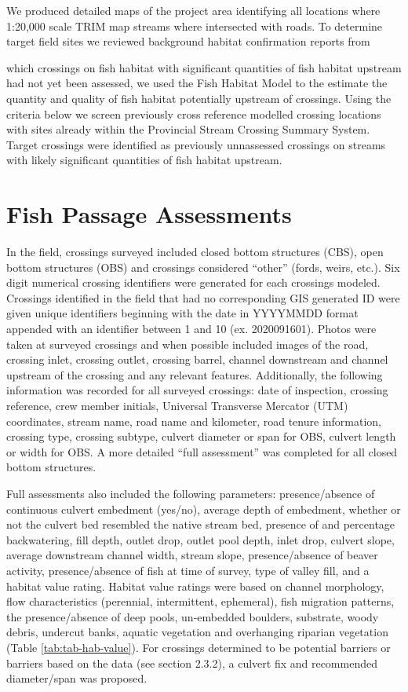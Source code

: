 \documentclass[
]{book}
\begin{document}
We produced detailed maps of the project area identifying all locations where 1:20,000 scale TRIM map streams where intersected with roads. To determine target field sites we reviewed background habitat confirmation reports from \citep{masseEKConfirmation2015}

which crossings on fish habitat with significant quantities of fish habitat upstream had not yet been assessed, we used the Fish Habitat Model to the estimate the quantity and quality of fish habitat potentially upstream of crossings. Using the criteria below we screen previously cross reference modelled crossing locations with sites already within the Provincial Stream Crossing Summary System. Target crossings were identified as previously unnassessed crossings on streams with likely significant quantities of fish habitat upstream.

\hypertarget{fish-passage-assessments}{%
\section{Fish Passage Assessments}\label{fish-passage-assessments}}

In the field, crossings surveyed included closed bottom structures (CBS), open bottom structures (OBS) and crossings considered ``other'' (fords, weirs, etc.). Six digit numerical crossing identifiers were generated for each crossings modeled. Crossings identified in the field that had no corresponding GIS generated ID were given unique identifiers beginning with the date in YYYYMMDD format appended with an identifier between 1 and 10 (ex. 2020091601). Photos were taken at surveyed crossings and when possible included images of the road, crossing inlet, crossing outlet, crossing barrel, channel downstream and channel upstream of the crossing and any relevant features. Additionally, the following information was recorded for all surveyed crossings: date of inspection, crossing reference, crew member initials, Universal Transverse Mercator (UTM) coordinates, stream name, road name and kilometer, road tenure information, crossing type, crossing subtype, culvert diameter or span for OBS, culvert length or width for OBS. A more detailed ``full assessment'' was completed for all closed bottom structures.

Full assessments also included the following parameters: presence/absence of continuous culvert embedment (yes/no), average depth of embedment, whether or not the culvert bed resembled the native stream bed, presence of and percentage backwatering, fill depth, outlet drop, outlet pool depth, inlet drop, culvert slope, average downstream channel width, stream slope, presence/absence of beaver activity, presence/absence of fish at time of survey, type of valley fill, and a habitat value rating. Habitat value ratings were based on channel morphology, flow characteristics (perennial, intermittent, ephemeral), fish migration patterns, the presence/absence of deep pools, un-embedded boulders, substrate, woody debris, undercut banks, aquatic vegetation and overhanging riparian vegetation (Table \ref{tab:tab-hab-value}). For crossings determined to be potential barriers or barriers based on the data (see section 2.3.2), a culvert fix and recommended diameter/span was proposed.
\end{document}

